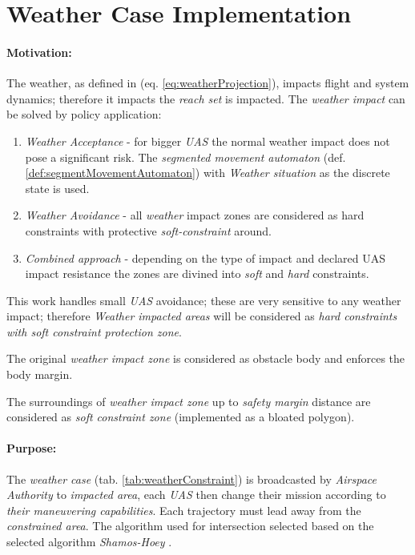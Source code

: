 \section{Weather Case Implementation}\label{sec:weatherCase}
\paragraph{Motivation:}  The weather, as defined in (eq. \ref{eq:weatherProjection}), impacts flight and system dynamics; therefore it impacts the \emph{reach set} is impacted. The \emph{weather impact} can be solved by policy application:

\begin{enumerate}
    \item \emph{Weather Acceptance} - for bigger \emph{UAS} the normal weather impact does not pose a significant risk.  The \emph{segmented movement automaton} (def. \ref{def:segmentMovementAutomaton}) with \emph{Weather situation} as the discrete state is used.
    
    \item \emph{Weather Avoidance} - all \emph{weather} impact zones are considered as hard constraints with protective \emph{soft-constraint} around.
    
    \item \emph{Combined approach} - depending on the type of impact and declared UAS impact resistance the zones are divined into \emph{soft} and \emph{hard} constraints.
\end{enumerate}

\begin{note}
    This work handles small \emph{UAS} avoidance; these are very sensitive to any weather impact; therefore \emph{Weather impacted areas} will be considered as \emph{hard constraints with soft constraint protection zone}. 
    
    The original \emph{weather impact zone} is considered as obstacle body and enforces the body margin.
    
    The surroundings of \emph{weather impact zone} up to \emph{safety margin} distance are considered as \emph{soft constraint zone} (implemented as a bloated polygon).
\end{note}

\paragraph{Purpose:} The \emph{weather case} (tab. \ref{tab:weatherConstraint}) is broadcasted by \emph{Airspace Authority} to \emph{impacted area}, each \emph{UAS} then change their mission according to \emph{their maneuvering capabilities}.  Each trajectory must lead away from the \emph{constrained area}. The algorithm used for intersection selected based on \citep{bentley1979algorithms} the selected algorithm  \emph{Shamos-Hoey} \cite{shamos1976geometric}.

